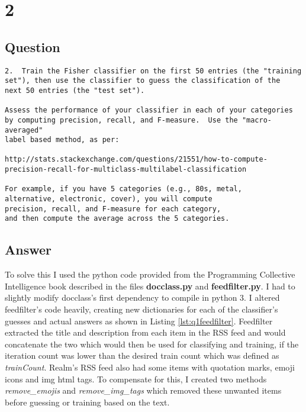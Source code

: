 \documentclass[letterpaper,11pt]{article}
\begin{document}
\clearpage


\section*{2}

\subsection*{Question}

\begin{verbatim}
2.  Train the Fisher classifier on the first 50 entries (the "training
set"), then use the classifier to guess the classification of the
next 50 entries (the "test set").

Assess the performance of your classifier in each of your categories
by computing precision, recall, and F-measure.  Use the "macro-averaged"
label based method, as per:

http://stats.stackexchange.com/questions/21551/how-to-compute-precision-recall-for-multiclass-multilabel-classification

For example, if you have 5 categories (e.g., 80s, metal,
alternative, electronic, cover), you will compute 
precision, recall, and F-measure for each category,
and then compute the average across the 5 categories.
\end{verbatim}

\subsection*{Answer}

To solve this I used the python code provided from the Programming Collective Intelligence book described in the files \textbf{docclass.py} and \textbf{feedfilter.py}. I had to slightly modify docclass's first dependency to compile in python 3. I altered feedfilter's code heavily, creating new dictionaries for each of the classifier's guesses and actual answers as shown in Listing \ref{lst:q1feedfilter}. Feedfilter extracted the title and description from each item in the RSS feed and would concatenate the two which would then be used for classifying and training, if the iteration count was lower than the desired train count which was defined as \textit{trainCount}. Realm's RSS feed also had some items with quotation marks, emoji icons and img html tags. To compensate for this, I created two methods \textit{remove_emojis} and \textit{remove_img_tags} which removed these unwanted items before guessing or training based on the text.
\end{document}
